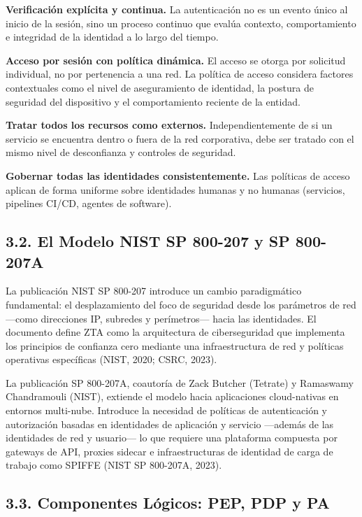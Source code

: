 \documentclass[12pt,a4paper]{article}
\begin{document}
\textbf{Verificación explícita y continua.} La autenticación no es un evento único al inicio de la sesión, sino un proceso continuo que evalúa contexto, comportamiento e integridad de la identidad a lo largo del tiempo.

\textbf{Acceso por sesión con política dinámica.} El acceso se otorga por solicitud individual, no por pertenencia a una red. La política de acceso considera factores contextuales como el nivel de aseguramiento de identidad, la postura de seguridad del dispositivo y el comportamiento reciente de la entidad.

\textbf{Tratar todos los recursos como externos.} Independientemente de si un servicio se encuentra dentro o fuera de la red corporativa, debe ser tratado con el mismo nivel de desconfianza y controles de seguridad.

\textbf{Gobernar todas las identidades consistentemente.} Las políticas de acceso aplican de forma uniforme sobre identidades humanas y no humanas (servicios, pipelines CI/CD, agentes de software).

\subsection{3.2. El Modelo NIST SP 800-207 y SP 800-207A}

La publicación NIST SP 800-207 introduce un cambio paradigmático fundamental: el desplazamiento del foco de seguridad desde los parámetros de red —como direcciones IP, subredes y perímetros— hacia las identidades. El documento define ZTA como la arquitectura de ciberseguridad que implementa los principios de confianza cero mediante una infraestructura de red y políticas operativas específicas (NIST, 2020; CSRC, 2023).

La publicación SP 800-207A, coautoría de Zack Butcher (Tetrate) y Ramaswamy Chandramouli (NIST), extiende el modelo hacia aplicaciones cloud-nativas en entornos multi-nube. Introduce la necesidad de políticas de autenticación y autorización basadas en identidades de aplicación y servicio —además de las identidades de red y usuario— lo que requiere una plataforma compuesta por gateways de API, proxies sidecar e infraestructuras de identidad de carga de trabajo como SPIFFE (NIST SP 800-207A, 2023).

\subsection{3.3. Componentes Lógicos: PEP, PDP y PA}
\end{document}
